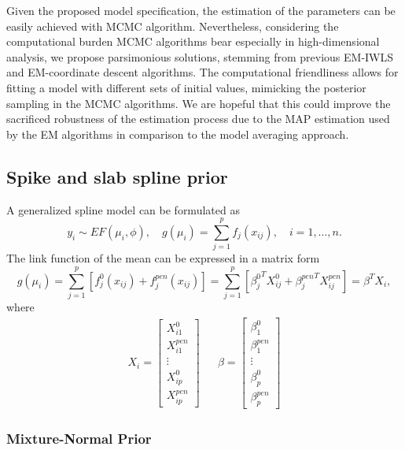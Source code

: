 \documentclass[AMA,STIX1COL,]{WileyNJD-v2}
\begin{document}
Given the proposed model specification, the estimation of the parameters
can be easily achieved with MCMC algorithm. Nevertheless, considering
the computational burden MCMC algorithms bear especially in
high-dimensional analysis, we propose parsimonious solutions, stemming
from previous EM-IWLS \citep{Rockova2014a}and EM-coordinate descent
algorithms\citep{Tang2018, Tang2019}. The computational friendliness
allows for fitting a model with different sets of initial values,
mimicking the posterior sampling in the MCMC algorithms. We are hopeful
that this could improve the sacrificed robustness of the estimation
process due to the MAP estimation used by the EM algorithms in
comparison to the model averaging approach.

\hypertarget{spike-and-slab-spline-prior-1}{%
\subsection{Spike and slab spline
prior}\label{spike-and-slab-spline-prior-1}}

A generalized spline model can be formulated as \[
y_i \sim EF(\mu_i, \phi), \quad g(\mu_i) = \sum\limits_{j=1}^p f_j(x_{ij}), \quad i = 1, \dots, n.
\] The link function of the mean can be expressed in a matrix form \[
g(\mu_i) = \sum\limits_{j=1}^p\left[f_j^0(x_{ij}) + f_j^{pen}(x_{ij})\right] = \sum\limits_{j=1}^p\left[{\beta_j^0}^T X_{ij}^0 + {\beta_j^{pen}}^T X_{ij}^{pen}\right]
 = \beta^T X_i,
\] where \[
\begin{aligned}
  X_i = \begin{bmatrix}X^0_{i1}\\X^{pen}_{i1}\\\vdots \\X^0_{ip}\\X^{pen}_{ip}\end{bmatrix}
& &
  \beta = \begin{bmatrix}\beta^0_1\\\beta^{pen}_{1}\\\vdots \\\beta^0_{p}\\\beta^{pen}_{p}\end{bmatrix}
\end{aligned}
\]

\hfill\break

\hypertarget{mixture-normal-prior}{%
\subsubsection{Mixture-Normal Prior}\label{mixture-normal-prior}}
\end{document}
